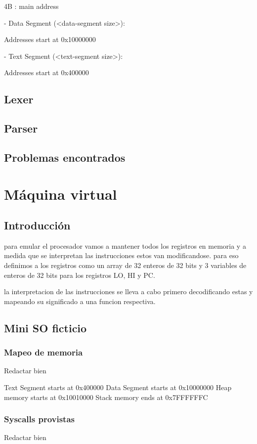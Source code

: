 \documentclass[12pt]{article}
\begin{document}
    4B : main address

- Data Segment (<data-segment size>):

    Addresses start at 0x10000000

- Text Segment (<text-segment size>):

    Addresses start at 0x400000

\subsection{Lexer}
\subsection{Parser}
\subsection{Problemas encontrados}
    
   
\section{Máquina virtual}
\subsection{Introducción}
para emular el procesador vamos a mantener todos los registros en memoria y a
medida que se interpretan las instrucciones estos van modificandose.
para eso definimos a los registros como un array de 32 enteros de 32 bits
y 3 variables de enteros de 32 bits para  los registros LO, HI y PC.

la interpretacion de las instrucciones se lleva a cabo primero decodificando
estas y mapeando su significado a una funcion respectiva.
\subsection{Mini SO ficticio}
\subsubsection{Mapeo de memoria}
Redactar bien

Text Segment starts at 0x400000
Data Segment starts at 0x10000000
Heap memory starts at 0x10010000
Stack memory ends at 0x7FFFFFFC
\subsubsection{Syscalls provistas}
Redactar bien
\end{document}
